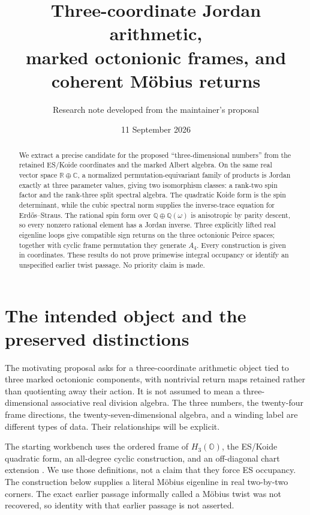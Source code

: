\documentclass[11pt]{article}
\title{Three-coordinate Jordan arithmetic,\texorpdfstring{\\}{ }marked octonionic frames, and coherent M\"obius returns}
\author{Research note developed from the maintainer's proposal}
\date{11 September 2026}
\theoremstyle{definition}\newtheorem{definition}[theorem]{Definition}
\newcommand{\R}{\mathbb R}\newcommand{\Q}{\mathbb Q}\newcommand{\Z}{\mathbb Z}
\newcommand{\C}{\mathbb C}\newcommand{\OO}{\mathbb O}
\begin{document}
\maketitle
\begin{abstract}
We extract a precise candidate for the proposed ``three-dimensional numbers'' from the retained ES/Koide coordinates and the marked Albert algebra. On the same real vector space $\R\oplus\C$, a normalized permutation-equivariant family of products is Jordan exactly at three parameter values, giving two isomorphism classes: a rank-two spin factor and the rank-three split spectral algebra. The quadratic Koide form is the spin determinant, while the cubic spectral norm supplies the inverse-trace equation for Erd\H{o}s--Straus. The rational spin form over $\Q\oplus\Q(\omega)$ is anisotropic by parity descent, so every nonzero rational element has a Jordan inverse. Three explicitly lifted real eigenline loops give compatible sign returns on the three octonionic Peirce spaces; together with cyclic frame permutation they generate $A_4$. Every construction is given in coordinates. These results do not prove primewise integral occupancy or identify an unspecified earlier twist passage. No priority claim is made.
\end{abstract}

\section{The intended object and the preserved distinctions}
The motivating proposal asks for a three-coordinate arithmetic object tied to three marked octonionic components, with nontrivial return maps retained rather than quotienting away their action. It is not assumed to mean a three-dimensional associative real division algebra. The three numbers, the twenty-four frame directions, the twenty-seven-dimensional algebra, and a winding label are different types of data. Their relationships will be explicit.

The starting workbench uses the ordered frame of $H_3(\OO)$, the ES/Koide quadratic form, an all-degree cyclic construction, and an off-diagonal chart extension \cite{workbench}. We use those definitions, not a claim that they force ES occupancy. The construction below supplies a literal M\"obius eigenline in real two-by-two corners. The exact earlier passage informally called a M\"obius twist was not recovered, so identity with that earlier passage is not asserted.
\end{document}
